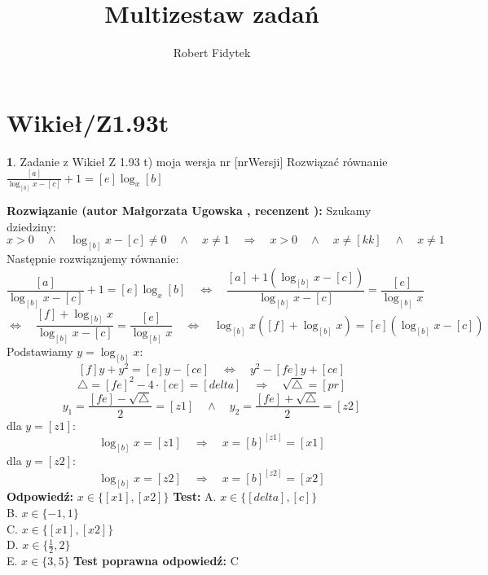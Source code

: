 \documentclass[12pt, a4paper]{article}
\title{Multizestaw zadań}
\author{Robert Fidytek}
\date{}
\theoremstyle{definition} %
\newtheorem{zad}{}
\newcommand{\kategoria}[1]{\section{#1}} %
\newcommand{\zadStart}[1]{\begin{zad}#1\newline} %
\newcommand{\zadStop}{\end{zad}}   %
\newcommand{\rozwStart}[2]{\noindent \textbf{Rozwiązanie (autor #1 , recenzent #2): }\newline} %
\newcommand{\rozwStop}{\newline}                                            %
\newcommand{\odpStart}{\noindent \textbf{Odpowiedź:}\newline}    %
\newcommand{\odpStop}{\newline}                                             %
\newcommand{\testStart}{\noindent \textbf{Test:}\newline} %
\newcommand{\testStop}{\newline} %
\newcommand{\kluczStart}{\noindent \textbf{Test poprawna odpowiedź:}\newline} %
\newcommand{\kluczStop}{\newline} %
\begin{document}
\maketitle


\kategoria{Wikieł/Z1.93t}
\zadStart{Zadanie z Wikieł Z 1.93 t) moja wersja nr [nrWersji]}
Rozwiązać równanie $\frac{[a]}{\log_{[b]}{x}-[c]} + 1 = [e] \log_{x}{[b]}$
\zadStop
\rozwStart{Małgorzata Ugowska}{}
Szukamy dziedziny:
$$ x>0 \quad \land \quad \log_{[b]}{x}-[c] \ne 0 \quad \land \quad x \ne 1 \quad \Longrightarrow \quad  x>0 \quad \land \quad x \ne [kk] \quad \land \quad x \ne 1$$
Następnie rozwiązujemy równanie:
$$\frac{[a]}{\log_{[b]}{x}-[c]} + 1 = [e] \log_{x}{[b]} \quad \Longleftrightarrow \quad \frac{[a]+1(\log_{[b]}{x}-[c])}{\log_{[b]}{x}-[c]} = \frac{[e]}{\log_{[b]}{x}} $$
$$\Longleftrightarrow \quad \frac{[f]+\log_{[b]}{x}}{\log_{[b]}{x}-[c]} = \frac{[e]}{\log_{[b]}{x}} \quad \Longleftrightarrow \quad \log_{[b]}{x} ([f]+\log_{[b]}{x}) = [e](\log_{[b]}{x}-[c]) $$
Podstawiamy $y=\log_{[b]}{x}$:
$$ [f]y +y^2 = [e]y- [ce] \quad \Longleftrightarrow \quad y^2 -[fe]y +[ce]$$
$$ \bigtriangleup = [fe]^2 - 4 \cdot [ce] = [delta] \quad  \Longrightarrow \quad \sqrt{\bigtriangleup} = [pr]$$
$$y_1=\frac{[fe]-\sqrt{\bigtriangleup}}{2} =[z1]  \quad \land \quad y_2=\frac{[fe]+\sqrt{\bigtriangleup}}{2} =[z2]$$
dla $y=[z1]$:
$$\log_{[b]}{x} = [z1] \quad  \Longrightarrow \quad x = [b]^{[z1]} = [x1]$$
dla $y=[z2]$:
$$\log_{[b]}{x} = [z2] \quad  \Longrightarrow \quad x = [b]^{[z2]} = [x2]$$
\rozwStop
\odpStart
$x \in \{[x1],[x2]\}$
\odpStop
\testStart
A. $x \in \{[delta], [c]\}$\\
B. $x \in \{-1, 1\}$\\
C. $x \in \{[x1], [x2]\}$\\
D. $x \in \{\frac{1}{2}, 2\}$\\
E. $x \in \{3, 5\}$
\testStop
\kluczStart
C
\kluczStop
\end{document}
